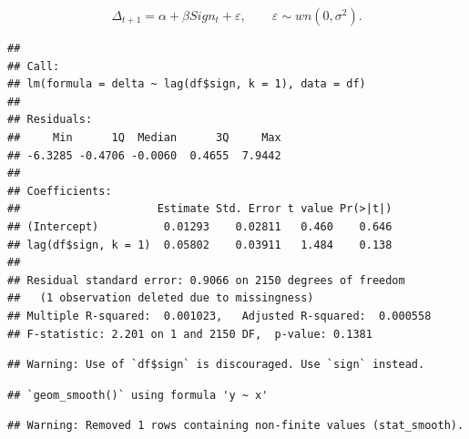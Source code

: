 \documentclass[11pt, a4paper]{report}
\newenvironment{Shaded}{\begin{snugshade}}{\end{snugshade}}
\newcommand{\DataTypeTok}[1]{\textcolor[rgb]{0.13,0.29,0.53}{#1}}
\newcommand{\DecValTok}[1]{\textcolor[rgb]{0.00,0.00,0.81}{#1}}
\newcommand{\KeywordTok}[1]{\textcolor[rgb]{0.13,0.29,0.53}{\textbf{#1}}}
\newcommand{\NormalTok}[1]{#1}
\newcommand{\OperatorTok}[1]{\textcolor[rgb]{0.81,0.36,0.00}{\textbf{#1}}}
\newcommand{\StringTok}[1]{\textcolor[rgb]{0.31,0.60,0.02}{#1}}
\theoremstyle{plain}
\theoremstyle{plain}
\theoremstyle{remark}
\begin{document}
\[\Delta_{t+1} = \alpha + \beta Sign_t + \varepsilon, \hspace{2em} \varepsilon \sim wn(0, \sigma^2).\]

\begin{Shaded}
\end{Shaded}

\begin{verbatim}
## 
## Call:
## lm(formula = delta ~ lag(df$sign, k = 1), data = df)
## 
## Residuals:
##     Min      1Q  Median      3Q     Max 
## -6.3285 -0.4706 -0.0060  0.4655  7.9442 
## 
## Coefficients:
##                     Estimate Std. Error t value Pr(>|t|)
## (Intercept)          0.01293    0.02811   0.460    0.646
## lag(df$sign, k = 1)  0.05802    0.03911   1.484    0.138
## 
## Residual standard error: 0.9066 on 2150 degrees of freedom
##   (1 observation deleted due to missingness)
## Multiple R-squared:  0.001023,   Adjusted R-squared:  0.000558 
## F-statistic: 2.201 on 1 and 2150 DF,  p-value: 0.1381
\end{verbatim}

\begin{Shaded}
\end{Shaded}

\begin{verbatim}
## Warning: Use of `df$sign` is discouraged. Use `sign` instead.
\end{verbatim}

\begin{verbatim}
## `geom_smooth()` using formula 'y ~ x'
\end{verbatim}

\begin{verbatim}
## Warning: Removed 1 rows containing non-finite values (stat_smooth).
\end{verbatim}
\end{document}
